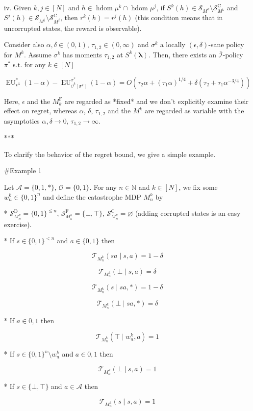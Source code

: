 \documentclass[a4paper]{article}
\newcommand{\Bool}{\{0,1\}}
\newcommand{\AP}[1]{\left(#1\right)}
\newcommand{\AB}[1]{\left[#1\right]}
\newcommand{\Nats}{\mathbb{N}}
\newcommand{\Estr}{\boldsymbol{\lambda}}
\newcommand{\Ob}{\mathcal{O}}
\newcommand{\A}{\mathcal{A}}
\newcommand{\St}{\mathcal{S}}
\newcommand{\T}{\mathcal{T}}
\newcommand{\In}{\mathcal{I}}
\newcommand{\Adi}{{\bar{\In}}}
\DeclareMathOperator{\HD}{hdom}
\newcommand{\SF}{\St^{\text{F}}}
\newcommand{\SD}{\St^{\text{D}}}
\newcommand{\SC}{\St^{\text{C}}}
\newcommand{\MF}{M^{\text{F}}}
\newcommand{\EU}{\operatorname{EU}}
\begin{document}
iv. Given $k,j \in [N]$ and $h \in \HD{\mu^k} \cap \HD{\mu^j}$, if $S^k(h) \in \St_{M^k} \setminus \SC_{M^k}$ and $S^j(h) \in \St_{M^j} \setminus \SC_{M^j}$, then $r^k(h)=r^j(h)$ (this condition means that in uncorrupted states, the reward is observable).

Consider also $\alpha,\delta\in(0,1)$, $\tau_{1,2} \in (0,\infty)$ and $\sigma^k$ a locally $(\epsilon,\delta)$-sane policy for $M^k$. Assume $\sigma^k$ has moments $\tau_{1,2}$ at $S^k(\Estr)$. Then, there exists an $\Adi$-policy $\pi^*$ s.t. for any $k \in [N]$

$$\EU_{\upsilon^k}^*(1-\alpha) - \EU_{\bar{\upsilon}^k\AB{\sigma^k}}^{\pi^*}(1-\alpha) = O\AP{\tau_2 \alpha + (\tau_1 \alpha)^{1/4} + \delta \AP{\tau_2 + \tau_1 \alpha^{-3/4}}}$$

Here, $\epsilon$ and the $\MF_k$ are regarded as *fixed* and we don't explicitly examine their effect on regret, whereas $\alpha$, $\delta$, $\tau_{1,2}$ and the $M^k$ are regarded as variable with the asymptotics $\alpha,\delta \rightarrow 0$, $\tau_{1,2} \rightarrow \infty$.

***

To clarify the behavior of the regret bound, we give a simple example.

\#Example 1

Let $\A = \{0,1,*\}$, $\Ob=\Bool$. For any $n \in \Nats$ and $k \in [N]$, we fix some $w_n^k \in \Bool^n$ and define the catastrophe MDP $M_n^k$ by

* $\SD_{M_n^k} = \Bool^{\leq n}$, $\SF_{M_n^k} = \{\bot,\top\}$, $\SC_{M_n^k} = \varnothing$ (adding corrupted states is an easy exercise).

* If $s \in \Bool^{< n}$ and $a \in \Bool$ then 

$$\T_{M_n^k}(sa \mid s,a) = 1 - \delta$$

$$\T_{M_n^k}(\bot \mid s,a) = \delta$$

$$\T_{M_n^k}(s \mid sa,*) = 1 - \delta$$

$$\T_{M_n^k}(\bot \mid sa,*) = \delta$$

* If $a \in {0,1}$ then

$$\T_{M_n^k}(\top \mid w_n^k,a) = 1$$

* If $s \in \Bool^n \setminus w_n^k$ and $a \in {0,1}$ then

$$\T_{M_n^k}(\bot \mid s,a) = 1$$

* If $s \in \{\bot,\top\}$ and $a \in \A$ then

$$\T_{M_n^k}(s \mid s,a) = 1$$
\end{document}
